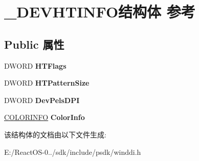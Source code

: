 \hypertarget{struct___d_e_v_h_t_i_n_f_o}{}\section{\+\_\+\+D\+E\+V\+H\+T\+I\+N\+F\+O结构体 参考}
\label{struct___d_e_v_h_t_i_n_f_o}
\subsection*{Public 属性}
\begin{DoxyCompactItemize}
\item 
\mbox{\label{struct___d_e_v_h_t_i_n_f_o_ab9cd77d62b826183c2a33e7147992623}} 
D\+W\+O\+RD {\bfseries H\+T\+Flags}
\item 
\mbox{\label{struct___d_e_v_h_t_i_n_f_o_a5a6cecbcdbba5d72cfaab38b8c7284fa}} 
D\+W\+O\+RD {\bfseries H\+T\+Pattern\+Size}
\item 
\mbox{\label{struct___d_e_v_h_t_i_n_f_o_ab25904debda5992463bfc96e5193083d}} 
D\+W\+O\+RD {\bfseries Dev\+Pels\+D\+PI}
\item 
\mbox{\label{struct___d_e_v_h_t_i_n_f_o_a63f6469c55cfdc5e4977f5f13234fc8e}} 
\hyperlink{struct___c_o_l_o_r_i_n_f_o}{C\+O\+L\+O\+R\+I\+N\+FO} {\bfseries Color\+Info}
\end{DoxyCompactItemize}


该结构体的文档由以下文件生成\+:\begin{DoxyCompactItemize}
\item 
E\+:/\+React\+O\+S-\/0../sdk/include/psdk/winddi.\+h\end{DoxyCompactItemize}
